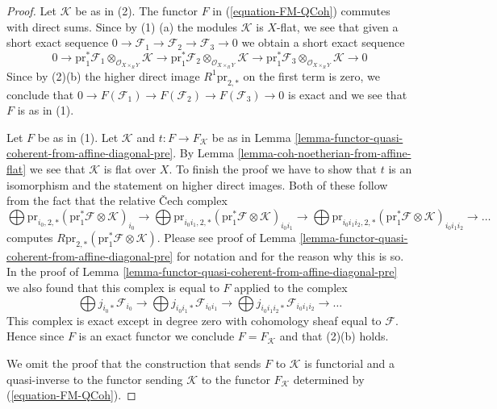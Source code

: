 \documentclass[10pt,a4paper]{amsart}
\theoremstyle{plain}
\theoremstyle{definition}
\theoremstyle{remark}
\numberwithin{equation}{subsection}
\begin{document}
\begin{proof}
Let $\mathcal{K}$ be as in (2). The functor $F$ in
(\ref{equation-FM-QCoh}) commutes with direct sums.
Since by (1) (a) the modules $\mathcal{K}$ is $X$-flat,
we see that given a short exact
sequence $0 \to \mathcal{F}_1 \to \mathcal{F}_2 \to \mathcal{F}_3 \to 0$
we obtain a short exact sequence
$$
0 \to
\text{pr}_1^*\mathcal{F}_1 \otimes_{\mathcal{O}_{X \times_R Y}} \mathcal{K} \to
\text{pr}_1^*\mathcal{F}_2 \otimes_{\mathcal{O}_{X \times_R Y}} \mathcal{K} \to
\text{pr}_1^*\mathcal{F}_3 \otimes_{\mathcal{O}_{X \times_R Y}} \mathcal{K} \to
0
$$
Since by (2)(b) the higher direct image $R^1\text{pr}_{2, *}$
on the first term is zero, we conclude that
$0 \to F(\mathcal{F}_1) \to F(\mathcal{F}_2) \to F(\mathcal{F}_3) \to 0$
is exact and we see that $F$ is as in (1).

\medskip\noindent
Let $F$ be as in (1). Let $\mathcal{K}$ and $t : F \to F_\mathcal{K}$ be as
in Lemma \ref{lemma-functor-quasi-coherent-from-affine-diagonal-pre}.
By Lemma \ref{lemma-coh-noetherian-from-affine-flat} we see
that $\mathcal{K}$ is flat over $X$. To finish the proof we have
to show that $t$ is an isomorphism and the statement on higher
direct images. Both of these follow from the fact that the
relative {\v C}ech complex
$$
\bigoplus 
\text{pr}_{i_0, 2, *}
(\text{pr}_1^*\mathcal{F} \otimes \mathcal{K})_{i_0}
\to
\bigoplus 
\text{pr}_{i_0i_1, 2, *}
(\text{pr}_1^*\mathcal{F} \otimes \mathcal{K})_{i_0i_1}
\to
\bigoplus 
\text{pr}_{i_0i_1i_2, 2, *}
(\text{pr}_1^*\mathcal{F} \otimes \mathcal{K})_{i_0i_1i_2}
\to \ldots
$$
computes $R\text{pr}_{2, *}(\text{pr}_1^*\mathcal{F} \otimes \mathcal{K})$.
Please see proof of
Lemma \ref{lemma-functor-quasi-coherent-from-affine-diagonal-pre}
for notation and for the reason why this is so. In the proof of
Lemma \ref{lemma-functor-quasi-coherent-from-affine-diagonal-pre}
we also found that this complex is equal to $F$ applied to the complex
$$
\bigoplus j_{i_0*}\mathcal{F}_{i_0} \to
\bigoplus j_{i_0i_1*}\mathcal{F}_{i_0i_1} \to
\bigoplus j_{i_0i_1i_2*}\mathcal{F}_{i_0i_1i_2} \to \ldots
$$
This complex is exact except in degree zero with cohomology
sheaf equal to $\mathcal{F}$. Hence since $F$ is an exact functor
we conclude $F = F_\mathcal{K}$ and that (2)(b) holds.

\medskip\noindent
We omit the proof that the construction that sends $F$ to
$\mathcal{K}$ is functorial and a quasi-inverse to the
functor sending $\mathcal{K}$ to the functor $F_\mathcal{K}$
determined by (\ref{equation-FM-QCoh}).
\end{proof}
\end{document}
